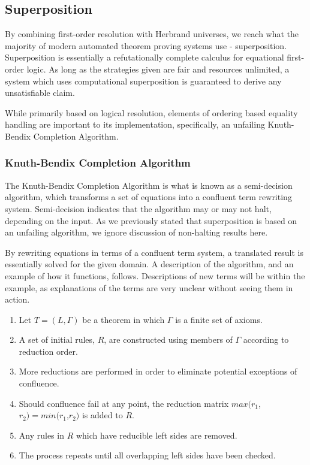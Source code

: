 \subsection{Superposition}

By combining first-order resolution with Herbrand universes, we reach what the majority of modern automated theorem proving systems use - superposition. Superposition is essentially a refutationally complete calculus for equational first-order logic. As long as the strategies given are fair and resources unlimited, a system which uses computational superposition is guaranteed to derive any unsatisfiable claim.

While primarily based on logical resolution, elements of ordering based equality handling are important to its implementation, specifically, an unfailing Knuth-Bendix Completion Algorithm.

\subsubsection{Knuth-Bendix Completion Algorithm}

The Knuth-Bendix Completion Algorithm is what is known as a semi-decision algorithm, which transforms a set of equations into a confluent term rewriting system. Semi-decision indicates that the algorithm may or may not halt, depending on the input. As we previously stated that superposition is based on an unfailing algorithm, we ignore discussion of non-halting results here.

By rewriting equations in terms of a confluent term system, a translated result is essentially solved for the given domain. A description of the algorithm, and an example of how it functions, follows. Descriptions of new terms will be within the example, as explanations of the terms are very unclear without seeing them in action.

\begin{enumerate}
	\item Let $T=(L,\Gamma)$ be a theorem in which $\Gamma$ is a finite set of axioms.
	\item A set of initial rules, $R$, are constructed using members of $\Gamma$ according to reduction order.
	\item More reductions are performed in order to eliminate potential exceptions of confluence.
	\item Should confluence fail at any point, the reduction matrix $max(r_1$,$r_2)=min(r_1$,$r_2)$ is added to $R$.
	\item Any rules in $R$ which have reducible left sides are removed.
	\item The process repeats until all overlapping left sides have been checked.
\end{enumerate}

